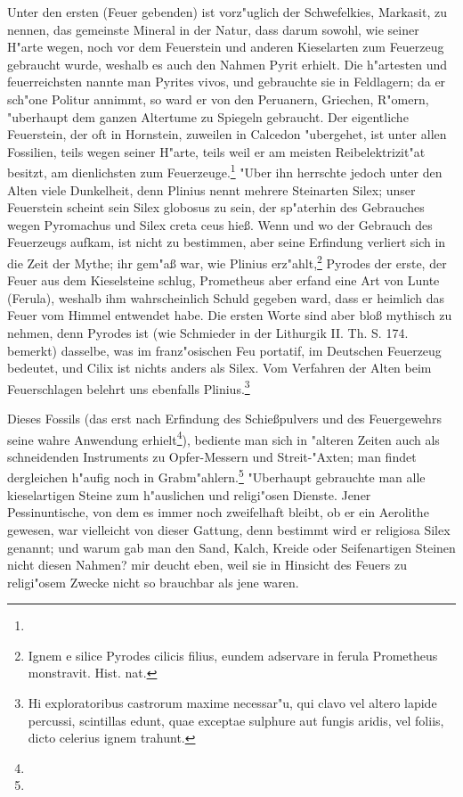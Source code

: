 \documentclass[a4paper, 11pt, oneside, polutonikogreek, german]{article}
\begin{document}
Unter den ersten (Feuer gebenden) ist vorz"uglich der Schwefelkies, Markasit, zu nennen, das gemeinste Mineral in der Natur, dass darum sowohl, wie seiner H"arte wegen, noch vor dem Feuerstein und anderen Kieselarten zum Feuerzeug gebraucht wurde, weshalb es auch den Nahmen Pyrit erhielt. Die h"artesten und feuerreichsten nannte man Pyrites vivos, und gebrauchte sie in Feldlagern; da er sch"one Politur annimmt, so ward er von den Peruanern, Griechen, R"omern, "uberhaupt dem ganzen Altertume zu Spiegeln gebraucht. Der eigentliche Feuerstein, der oft in Hornstein, zuweilen in Calcedon "ubergehet, ist unter allen Fossilien, teils wegen seiner H"arte, teils weil er am meisten Reibelektrizit"at besitzt, am dienlichsten zum Feuerzeuge.\footnote{} "Uber ihn herrschte jedoch unter den Alten viele Dunkelheit, denn Plinius nennt mehrere Steinarten Silex; unser Feuerstein scheint sein Silex globosus zu sein, der sp"aterhin des Gebrauches wegen Pyromachus und Silex creta ceus hieß. Wenn und wo der Gebrauch des Feuerzeugs aufkam, ist nicht zu bestimmen, aber seine Erfindung verliert sich in die Zeit der Mythe; ihr gem"aß war, wie Plinius erz"ahlt,\footnote{Ignem e silice Pyrodes cilicis filius, eundem adservare in ferula Prometheus monstravit. Hist. nat.} Pyrodes der erste, der Feuer aus dem Kieselsteine schlug, Prometheus aber erfand eine Art von Lunte (Ferula), weshalb ihm wahrscheinlich Schuld gegeben ward, dass er heimlich das Feuer vom Himmel entwendet habe. Die ersten Worte sind aber bloß mythisch zu nehmen, denn Pyrodes ist (wie Schmieder in der Lithurgik II. Th. S. 174. bemerkt) dasselbe, was im franz"osischen Feu portatif, im Deutschen Feuerzeug bedeutet, und Cilix ist nichts anders als Silex. Vom Verfahren der Alten beim Feuerschlagen belehrt uns ebenfalls Plinius.\footnote{Hi exploratoribus castrorum maxime necessar"u, qui clavo vel altero lapide percussi, scintillas edunt, quae exceptae sulphure aut fungis aridis, vel foliis, dicto celerius ignem trahunt.}

Dieses Fossils (das erst nach Erfindung des Schießpulvers und des Feuergewehrs seine wahre Anwendung erhielt\footnote{}), bediente man sich in "alteren Zeiten auch als schneidenden Instruments zu Opfer-Messern und Streit-"Axten; man findet dergleichen h"aufig noch in Grabm"ahlern.\footnote{} "Uberhaupt gebrauchte man alle kieselartigen Steine zum h"auslichen und religi"osen Dienste. Jener Pessinuntische, von dem es immer noch zweifelhaft bleibt, ob er ein Aerolithe gewesen, war vielleicht von dieser Gattung, denn bestimmt wird er religiosa Silex genannt; und warum gab man den Sand, Kalch, Kreide oder Seifenartigen Steinen nicht diesen Nahmen? mir deucht eben, weil sie in Hinsicht des Feuers zu religi"osem Zwecke nicht so brauchbar als jene waren.
\end{document}
